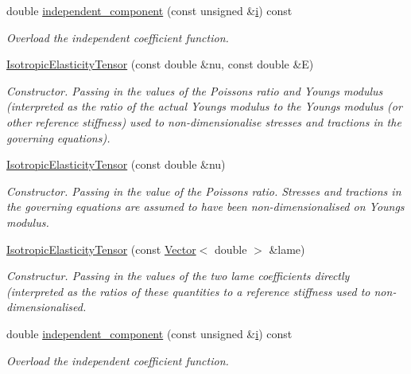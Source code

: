 \begin{DoxyCompactItemize}
double \hyperlink{classoomph_1_1IsotropicElasticityTensor_a6b4a91ef7585590886cd191a7c03827d}{independent\+\_\+component} (const unsigned \&\hyperlink{cfortran_8h_adb50e893b86b3e55e751a42eab3cba82}{i}) const
\begin{DoxyCompactList}\small\item\em Overload the independent coefficient function. \end{DoxyCompactList}\item 
\hyperlink{classoomph_1_1IsotropicElasticityTensor_a022f9a6cb2339393a2cbc8eee81717e5}{Isotropic\+Elasticity\+Tensor} (const double \&nu, const double \&E)
\begin{DoxyCompactList}\small\item\em Constructor. Passing in the values of the Poisson\textquotesingle{}s ratio and Young\textquotesingle{}s modulus (interpreted as the ratio of the actual Young\textquotesingle{}s modulus to the Young\textquotesingle{}s modulus (or other reference stiffness) used to non-\/dimensionalise stresses and tractions in the governing equations). \end{DoxyCompactList}\item 
\hyperlink{classoomph_1_1IsotropicElasticityTensor_a61cc521701ca584ca74477aab86865f6}{Isotropic\+Elasticity\+Tensor} (const double \&nu)
\begin{DoxyCompactList}\small\item\em Constructor. Passing in the value of the Poisson\textquotesingle{}s ratio. Stresses and tractions in the governing equations are assumed to have been non-\/dimensionalised on Young\textquotesingle{}s modulus. \end{DoxyCompactList}\item 
\hyperlink{classoomph_1_1IsotropicElasticityTensor_a0f4785c975f317f98864f28bb977a516}{Isotropic\+Elasticity\+Tensor} (const \hyperlink{classoomph_1_1Vector}{Vector}$<$ double $>$ \&lame)
\begin{DoxyCompactList}\small\item\em Constructur. Passing in the values of the two lame coefficients directly (interpreted as the ratios of these quantities to a reference stiffness used to non-\/dimensionalised. \end{DoxyCompactList}\item 
double \hyperlink{classoomph_1_1IsotropicElasticityTensor_a6b4a91ef7585590886cd191a7c03827d}{independent\+\_\+component} (const unsigned \&\hyperlink{cfortran_8h_adb50e893b86b3e55e751a42eab3cba82}{i}) const
\begin{DoxyCompactList}\small\item\em Overload the independent coefficient function. \end{DoxyCompactList}\end{DoxyCompactItemize}
